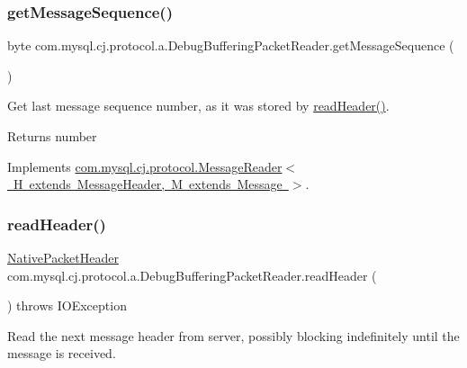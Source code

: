 \subsubsection{\texorpdfstring{get\+Message\+Sequence()}{getMessageSequence()}}
{\footnotesize\ttfamily byte com.\+mysql.\+cj.\+protocol.\+a.\+Debug\+Buffering\+Packet\+Reader.\+get\+Message\+Sequence (\begin{DoxyParamCaption}{ }\end{DoxyParamCaption})}

Get last message sequence number, as it was stored by \mbox{\hyperlink{classcom_1_1mysql_1_1cj_1_1protocol_1_1a_1_1_debug_buffering_packet_reader_a59ead81a6bb0f0b358f9e44db6b63280}{read\+Header()}}.

\begin{DoxyReturn}{Returns}
number 
\end{DoxyReturn}


Implements \mbox{\hyperlink{interfacecom_1_1mysql_1_1cj_1_1protocol_1_1_message_reader_ac4a36fb287c5308dd3d7e6157ef4e237}{com.\+mysql.\+cj.\+protocol.\+Message\+Reader$<$ H extends Message\+Header, M extends Message $>$}}.

\mbox{\label{classcom_1_1mysql_1_1cj_1_1protocol_1_1a_1_1_debug_buffering_packet_reader_a59ead81a6bb0f0b358f9e44db6b63280}} 
\subsubsection{\texorpdfstring{read\+Header()}{readHeader()}}
{\footnotesize\ttfamily \mbox{\hyperlink{classcom_1_1mysql_1_1cj_1_1protocol_1_1a_1_1_native_packet_header}{Native\+Packet\+Header}} com.\+mysql.\+cj.\+protocol.\+a.\+Debug\+Buffering\+Packet\+Reader.\+read\+Header (\begin{DoxyParamCaption}{ }\end{DoxyParamCaption}) throws I\+O\+Exception}

Read the next message header from server, possibly blocking indefinitely until the message is received.

